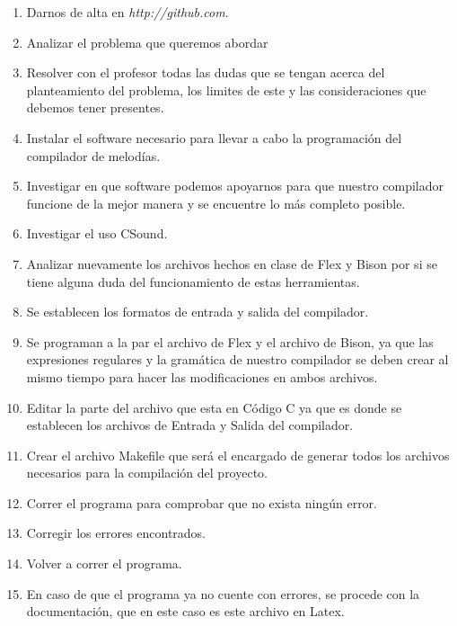 \documentclass[12pt]{article}
\begin{document}
\begin{enumerate}
\item Darnos de alta en \emph{http://github.com}.
\item Analizar el problema que queremos abordar\\
\item Resolver  con el profesor todas las dudas que se tengan acerca del planteamiento del problema, los limites de este y las consideraciones que debemos tener presentes.\\
\item Instalar el software necesario para llevar a cabo la programación del compilador de melodías.\\
\item Investigar en que software podemos apoyarnos para que nuestro compilador funcione de la mejor manera y se encuentre lo más completo posible.\\
\item Investigar el uso CSound.\\
\item Analizar nuevamente los archivos hechos en clase de Flex y Bison por si se tiene alguna duda del funcionamiento de estas herramientas.\\
\item Se establecen los formatos de entrada y salida del compilador.
\item Se programan a la par el archivo de Flex y el archivo de Bison, ya que las expresiones regulares y la gramática de nuestro compilador se deben crear al mismo tiempo para hacer las modificaciones en ambos archivos.\\
\item Editar la parte del archivo que esta en Código C ya que es donde se establecen los archivos de Entrada y Salida del compilador.\\
\item Crear el archivo Makefile que será el encargado de generar todos los archivos necesarios para la compilación del  proyecto.\\
\item Correr el programa para comprobar que no exista ningún error.\\
\item Corregir los errores encontrados.\\
\item Volver  a correr el programa.\\
\item En caso de que el programa ya no cuente con errores, se procede con la documentación, que en este caso es este archivo en Latex.\\

\end{enumerate}
\end{document}
